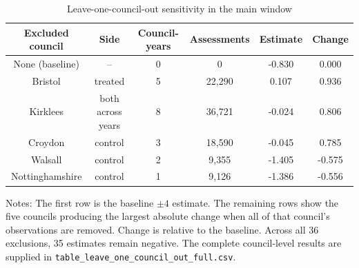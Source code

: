 \begin{table}[!h]
\centering
\begin{threeparttable}
\caption{Leave-one-council-out sensitivity in the main window}
\label{tab:qonlyreg_leave_one_council_out}
\small
\begin{tabular}{cccccc}
\toprule
Excluded council & Side & Council-years & Assessments & Estimate & Change \\
\midrule
None (baseline) & -- & 0 & 0 & -0.830 & 0.000 \\
Bristol & treated & 5 & 22,290 & 0.107 & 0.936 \\
Kirklees & both across years & 8 & 36,721 & -0.024 & 0.806 \\
Croydon & control & 3 & 18,590 & -0.045 & 0.785 \\
Walsall & control & 2 & 9,355 & -1.405 & -0.575 \\
Nottinghamshire & control & 1 & 9,126 & -1.386 & -0.556 \\
\bottomrule
\end{tabular}
\begin{tablenotes}[flushleft]
\footnotesize
\item Notes: The first row is the baseline $\pm4$ estimate. The remaining rows show the five councils producing the largest absolute change when all of that council's observations are removed. Change is relative to the baseline. Across all 36 exclusions, 35 estimates remain negative. The complete council-level results are supplied in \texttt{table\_leave\_one\_council\_out\_full.csv}.
\end{tablenotes}
\end{threeparttable}
\end{table}
